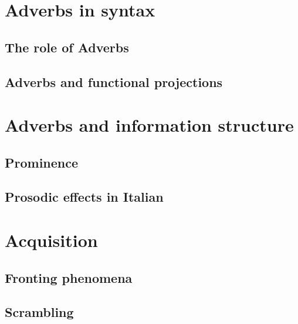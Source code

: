 \documentclass[
  a4paper,
  twoside,
  12pt,
  chapterprefix=false,
  bibliography=totocnumbered,
  listof=flat]{scrbook}
\begin{document}
\hypertarget{adverbs-in-syntax}{%
\section{Adverbs in syntax}\label{adverbs-in-syntax}}

\hypertarget{the-role-of-adverbs}{%
\subsection{The role of Adverbs}\label{the-role-of-adverbs}}

\hypertarget{adverbs-and-functional-projections}{%
\subsection{Adverbs and functional projections}\label{adverbs-and-functional-projections}}

\hypertarget{adverbs-and-information-structure}{%
\section{Adverbs and information structure}\label{adverbs-and-information-structure}}

\hypertarget{prominence}{%
\subsection{Prominence}\label{prominence}}

\hypertarget{prosodic-effects-in-italian}{%
\subsection{Prosodic effects in Italian}\label{prosodic-effects-in-italian}}

\hypertarget{acquisition}{%
\section{Acquisition}\label{acquisition}}

\hypertarget{fronting-phenomena}{%
\subsection{Fronting phenomena}\label{fronting-phenomena}}

\hypertarget{scrambling}{%
\subsection{Scrambling}\label{scrambling}}
\end{document}
